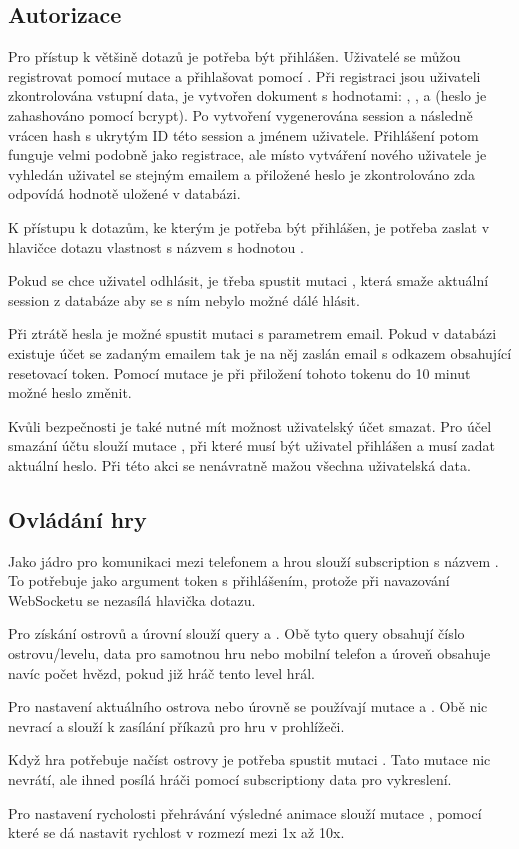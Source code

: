 \subsection{Autorizace}
Pro přístup k většině dotazů je potřeba být přihlášen. Uživatelé se můžou registrovat pomocí mutace  a přihlašovat pomocí . Při registraci jsou uživateli zkontrolována vstupní data, je vytvořen dokument s hodnotami: , ,  a  (heslo je zahashováno pomocí bcrypt\cite{bcrypt}). Po vytvoření vygenerována session a následně vrácen hash s ukrytým ID této session a jménem uživatele. Přihlášení potom funguje velmi podobně jako registrace, ale místo vytváření nového uživatele je vyhledán uživatel se stejným emailem a přiložené heslo je zkontrolováno zda odpovídá hodnotě uložené v databázi.\par
K přístupu k dotazům, ke kterým je potřeba být přihlášen, je potřeba zaslat v hlavičce dotazu vlastnost s názvem  s hodnotou .\par
Pokud se chce uživatel odhlásit, je třeba spustit mutaci , která smaže aktuální session z databáze aby se s ním nebylo možné dálé hlásit.\par
Při ztrátě hesla je možné spustit mutaci  s parametrem email. Pokud v databázi existuje účet se zadaným emailem tak je na něj zaslán email s odkazem obsahující resetovací token. Pomocí mutace  je při přiložení tohoto tokenu do 10 minut možné heslo změnit.\par
Kvůli bezpečnosti je také nutné mít možnost uživatelský účet smazat. Pro účel smazání účtu slouží mutace , při které musí být uživatel přihlášen a musí zadat aktuální heslo. Při této akci se nenávratně mažou všechna uživatelská data.

\subsection{Ovládání hry}
Jako jádro pro komunikaci mezi telefonem a hrou slouží subscription s názvem . To potřebuje jako argument token s přihlášením, protože při navazování WebSocketu se nezasílá hlavička dotazu.\par
Pro získání ostrovů a úrovní slouží query  a . Obě tyto query obsahují číslo ostrovu/levelu, data pro samotnou hru nebo mobilní telefon a úroveň obsahuje navíc počet hvězd, pokud již hráč tento level hrál.\par
Pro nastavení aktuálního ostrova nebo úrovně se používají mutace  a . Obě nic nevrací a slouží k zasílání příkazů pro hru v prohlížeči.\par
Když hra potřebuje načíst ostrovy je potřeba spustit mutaci . Tato mutace nic nevrátí, ale ihned posílá hráči pomocí subscriptiony data pro vykreslení.\par
Pro nastavení rycholosti přehrávání výsledné animace slouží mutace , pomocí které se dá nastavit rychlost v rozmezí mezi 1x až 10x.

